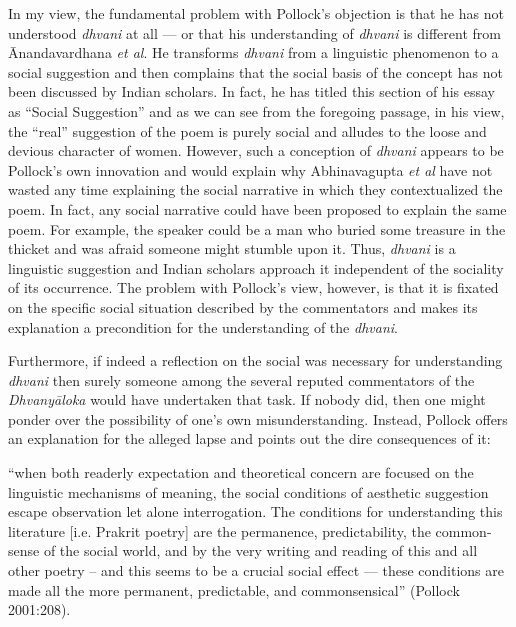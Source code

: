 In my view, the fundamental problem with Pollock's objection is that he has not understood \textsl{dhvani} at all --- or that his understanding of \textsl{dhvani} is different from Ānandavardhana \textsl{et al}. He transforms \textsl{dhvani} from a linguistic phenomenon to a social suggestion and then complains that the social basis of the concept has not been discussed by Indian scholars. In fact, he has titled this section of his essay as ``Social Suggestion'' and as we can see from the foregoing passage, in his view, the ``real'' suggestion of the poem is purely social and alludes to the loose and devious character of women. However, such a conception of \textsl{dhvani} appears to be Pollock's own innovation and would explain why Abhinavagupta \textsl{et al} have not wasted any time explaining the social narrative in which they contextualized the poem. In fact, any social narrative could have been proposed to explain the same poem. For example, the speaker could be a man who buried some treasure in the thicket and was afraid someone might stumble upon it. Thus, \textsl{dhvani} is a linguistic suggestion and Indian scholars approach it independent of the sociality of its occurrence. The problem with Pollock's view, however, is that it is fixated on the specific social situation described by the commentators and makes its explanation a precondition for the understanding of the \textsl{dhvani}. 

Furthermore, if indeed a reflection on the social was necessary for understanding \textsl{dhvani} then surely someone among the several reputed commentators of the \textsl{Dhvanyāloka} would have undertaken that task. If nobody did, then one might ponder over the possibility of one's own misunderstanding. Instead, Pollock offers an explanation for the alleged lapse and points out the dire consequences of it: 

\begin{myquote}
``when both readerly expectation and theoretical concern are focused on the linguistic mechanisms of meaning, the social conditions of aesthetic suggestion escape observation let alone interrogation. The conditions for understanding this literature [i.e. Prakrit poetry] are the permanence, predictability, the common-sense of the social world, and by the very writing and reading of this and all other poetry – and this seems to be a crucial social effect --- these conditions are made all the more permanent, predictable, and commonsensical''
\hfill (Pollock 2001:208). 
\end{myquote}

